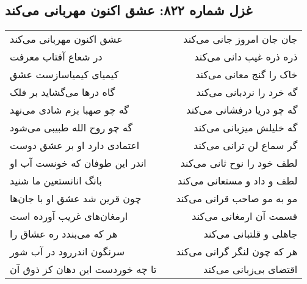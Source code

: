 \begin{center}
\section*{غزل شماره ۸۲۲: عشق اکنون مهربانی می‌کند}
\label{sec:0822}
\begin{longtable}{l p{0.5cm} r}
عشق اکنون مهربانی می‌کند
&&
جان جان امروز جانی می‌کند
\\
در شعاع آفتاب معرفت
&&
ذره ذره غیب دانی می‌کند
\\
کیمیای کیمیاسازست عشق
&&
خاک را گنج معانی می‌کند
\\
گاه درها می‌گشاید بر فلک
&&
گه خرد را نردبانی می‌کند
\\
گه چو صهبا بزم شادی می‌نهد
&&
گه چو دریا درفشانی می‌کند
\\
گه چو روح الله طبیبی می‌شود
&&
گه خلیلش میزبانی می‌کند
\\
اعتمادی دارد او بر عشق دوست
&&
گر سماع لن ترانی می‌کند
\\
اندر این طوفان که خونست آب او
&&
لطف خود را نوح ثانی می‌کند
\\
بانگ انانستعین ما شنید
&&
لطف و داد و مستعانی می‌کند
\\
چون قرین شد عشق او با جان‌ها
&&
مو به مو صاحب قرانی می‌کند
\\
ارمغان‌های غریب آورده است
&&
قسمت آن ارمغانی می‌کند
\\
هر که می‌بندد ره عشاق را
&&
جاهلی و قلتبانی می‌کند
\\
سرنگون اندررود در آب شور
&&
هر که چون لنگر گرانی می‌کند
\\
تا چه خوردست این دهان کز ذوق آن
&&
اقتضای بی‌زبانی می‌کند
\\
\end{longtable}
\end{center}
